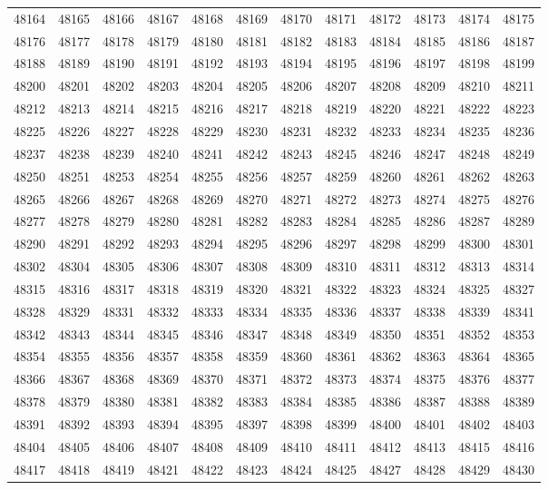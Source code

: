 \begin{center}
\begin{longtable}{llllllllllll}
48164 &48165 &48166 &48167 &48168 &48169 &48170 &48171 &48172 &48173 &48174 &48175 \\
48176 &48177 &48178 &48179 &48180 &48181 &48182 &48183 &48184 &48185 &48186 &48187 \\
48188 &48189 &48190 &48191 &48192 &48193 &48194 &48195 &48196 &48197 &48198 &48199 \\
48200 &48201 &48202 &48203 &48204 &48205 &48206 &48207 &48208 &48209 &48210 &48211 \\
48212 &48213 &48214 &48215 &48216 &48217 &48218 &48219 &48220 &48221 &48222 &48223 \\
48225 &48226 &48227 &48228 &48229 &48230 &48231 &48232 &48233 &48234 &48235 &48236 \\
48237 &48238 &48239 &48240 &48241 &48242 &48243 &48245 &48246 &48247 &48248 &48249 \\
48250 &48251 &48253 &48254 &48255 &48256 &48257 &48259 &48260 &48261 &48262 &48263 \\
48265 &48266 &48267 &48268 &48269 &48270 &48271 &48272 &48273 &48274 &48275 &48276 \\
48277 &48278 &48279 &48280 &48281 &48282 &48283 &48284 &48285 &48286 &48287 &48289 \\
48290 &48291 &48292 &48293 &48294 &48295 &48296 &48297 &48298 &48299 &48300 &48301 \\
48302 &48304 &48305 &48306 &48307 &48308 &48309 &48310 &48311 &48312 &48313 &48314 \\
48315 &48316 &48317 &48318 &48319 &48320 &48321 &48322 &48323 &48324 &48325 &48327 \\
48328 &48329 &48331 &48332 &48333 &48334 &48335 &48336 &48337 &48338 &48339 &48341 \\
48342 &48343 &48344 &48345 &48346 &48347 &48348 &48349 &48350 &48351 &48352 &48353 \\
48354 &48355 &48356 &48357 &48358 &48359 &48360 &48361 &48362 &48363 &48364 &48365 \\
48366 &48367 &48368 &48369 &48370 &48371 &48372 &48373 &48374 &48375 &48376 &48377 \\
48378 &48379 &48380 &48381 &48382 &48383 &48384 &48385 &48386 &48387 &48388 &48389 \\
48391 &48392 &48393 &48394 &48395 &48397 &48398 &48399 &48400 &48401 &48402 &48403 \\
48404 &48405 &48406 &48407 &48408 &48409 &48410 &48411 &48412 &48413 &48415 &48416 \\
48417 &48418 &48419 &48421 &48422 &48423 &48424 &48425 &48427 &48428 &48429 &48430 \\

\end{longtable}
\end{center}
